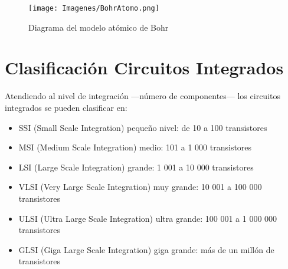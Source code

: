 \documentclass{article}
\begin{document}
\begin{figure}
    \centering
    \texttt{[image: Imagenes/BohrAtomo.png]}
    \caption{ Diagrama del modelo atómico de Bohr}
    \label{fig:bohrAtomo}
\end{figure}

\section{Clasificación Circuitos Integrados}

Atendiendo al nivel de integración —número de componentes— los circuitos integrados se pueden clasificar en:\citep{CirI}\\


\begin{itemize}
    \item   SSI (Small Scale Integration) pequeño nivel: de 10 a 100 transistores
    \item   MSI (Medium Scale Integration) medio: 101 a 1 000 transistores
    \item   LSI (Large Scale Integration) grande: 1 001 a 10 000 transistores
    \item   VLSI (Very Large Scale Integration) muy grande: 10 001 a 100 000 transistores
    \item   ULSI (Ultra Large Scale Integration) ultra grande: 100 001 a 1 000 000 transistores
    \item   GLSI (Giga Large Scale Integration) giga grande: más de un millón de transistores

\end{itemize}
  





 
 
 
 
 
 
 
\end{document}
